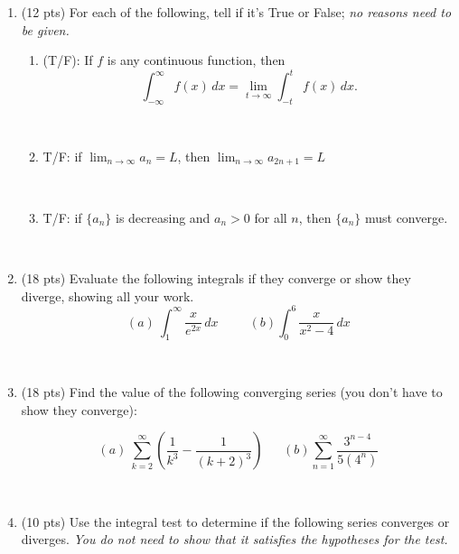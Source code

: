 \documentclass[11pt, oneside]{article}   	%
\title{}
\author{MATH1103   \ \ \ \ \ \ Midterm 3 \ \ \ \  November 19, 2021 \ \ \ \ \ \ Version A \\ Closed book, closed notes; show all your work.}
\date{}							%
\begin{document}
\maketitle
\begin{enumerate}

\item (12 pts) For each of the following, tell if it's True or False; \emph{no reasons need to be given.}
\begin{enumerate}
\item(T/F): If $f$ is any continuous function, then $$\int_{-\infty}^{\infty} f(x) \, dx=\lim_{t \to \infty} \int_{-t}^t f(x) \, dx.$$

\

\item
T/F: if $\lim_{n \to \infty}a_n=L$, then $\lim_{n \to \infty}a_{2n+1}
=L$ 

\

\item
T/F: if $\{a_n\}$ is decreasing and $a_n>0$ for all $n$, then $\{a_n\}$ must converge.
\end{enumerate} 

\

\item (18 pts) Evaluate the following integrals if they converge or show they diverge, showing all your work.
$$(a) \ \int_{1}^{\infty} \dfrac{x}{e^{2x}} \, dx \ \ \ \ \ \ \ \ \ \ \ (b) \int_0^6 \dfrac{x}{x^2-4} \, dx $$

\



\item (18 pts) Find the value of the following converging series (you don't have to show they converge):

$$(a) \ \sum_{k=2}^{\infty} \left( \dfrac{1}{k^{3}}- \dfrac{1}{(k+2)^{3}} \right) \ \ \ \ \ \ \ (b) \sum_{n=1}^{\infty} \dfrac{3^{n-4}}{5(4^n)} $$

\

\item (10 pts) Use the integral test to determine if the following series converges or diverges. \emph{You do not need to show that it satisfies the hypotheses for the test.}


\end{enumerate}
\end{document}
